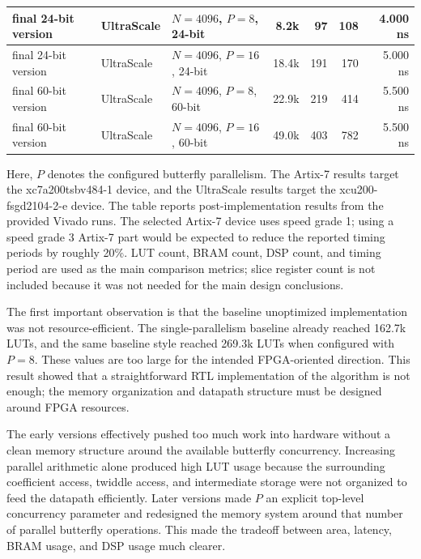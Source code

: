 \documentclass[a4paper, 12pt, titlepage]{article}
\begin{document}
\begin{table}[H]
\begin{tabularx}{\textwidth}{|l|l|Y|r|r|r|r|}
\hline
\hline
final 24-bit version & UltraScale & $N=4096$, $P=8$, 24-bit & 8.2k & 97 & 108 & 4.000 ns \\
\hline
final 24-bit version & UltraScale & $N=4096$, $P=16$, 24-bit & 18.4k & 191 & 170 & 5.000 ns \\
\hline
final 60-bit version & UltraScale & $N=4096$, $P=8$, 60-bit & 22.9k & 219 & 414 & 5.500 ns \\
\hline
final 60-bit version & UltraScale & $N=4096$, $P=16$, 60-bit & 49.0k & 403 & 782 & 5.500 ns \\
\hline
\end{tabularx}
\end{table}

Here, \(P\) denotes the configured butterfly parallelism. The Artix-7 results
target the xc7a200tsbv484-1 device, and the UltraScale results target the
xcu200-fsgd2104-2-e device. The table reports post-implementation results from
the provided Vivado runs. The selected Artix-7 device uses speed grade 1; using
a speed grade 3 Artix-7 part would be expected to reduce the reported timing
periods by roughly 20\%. LUT count, BRAM count, DSP count, and timing period are
used as the main comparison metrics; slice register count is not included
because it was not needed for the main design conclusions.

The first important observation is that the baseline unoptimized implementation
was not resource-efficient. The single-parallelism baseline already reached
162.7k LUTs, and the same baseline style reached 269.3k LUTs when configured
with \(P=8\). These values are too large for the intended FPGA-oriented
direction. This result showed that a straightforward RTL implementation of the
algorithm is not enough; the memory organization and datapath structure must be
designed around FPGA resources.

The early versions effectively pushed too much work into hardware without a
clean memory structure around the available butterfly concurrency. Increasing
parallel arithmetic alone produced high LUT usage because the surrounding
coefficient access, twiddle access, and intermediate storage were not organized
to feed the datapath efficiently. Later versions made \(P\) an explicit
top-level concurrency parameter and redesigned the memory system around that
number of parallel butterfly operations. This made the tradeoff between area,
latency, BRAM usage, and DSP usage much clearer.
\end{document}
